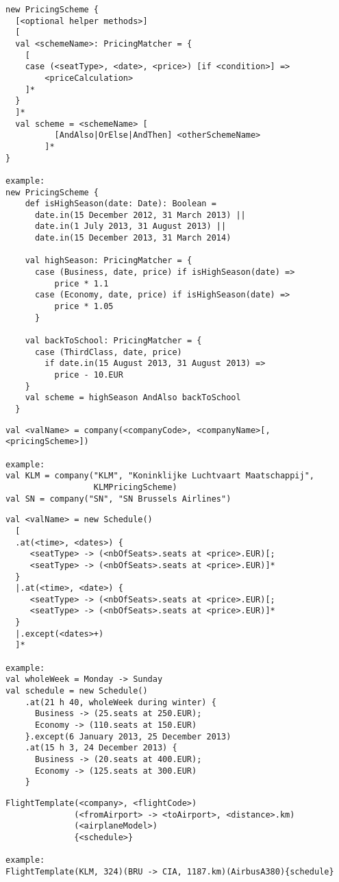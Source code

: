 \begin{lstlisting}
new PricingScheme {
  [<optional helper methods>]
  [
  val <schemeName>: PricingMatcher = {
    [
    case (<seatType>, <date>, <price>) [if <condition>] =>
        <priceCalculation>
    ]*
  }
  ]*
  val scheme = <schemeName> [
          [AndAlso|OrElse|AndThen] <otherSchemeName>
        ]*
}

example:
new PricingScheme {
    def isHighSeason(date: Date): Boolean =
      date.in(15 December 2012, 31 March 2013) ||
      date.in(1 July 2013, 31 August 2013) ||
      date.in(15 December 2013, 31 March 2014)

    val highSeason: PricingMatcher = {
      case (Business, date, price) if isHighSeason(date) =>
          price * 1.1
      case (Economy, date, price) if isHighSeason(date) =>
          price * 1.05
      }

    val backToSchool: PricingMatcher = {
      case (ThirdClass, date, price)
        if date.in(15 August 2013, 31 August 2013) =>
          price - 10.EUR
    }
    val scheme = highSeason AndAlso backToSchool
  }
\end{lstlisting}

\begin{lstlisting}
val <valName> = company(<companyCode>, <companyName>[, <pricingScheme>])

example:
val KLM = company("KLM", "Koninklijke Luchtvaart Maatschappij",
                  KLMPricingScheme)
val SN = company("SN", "SN Brussels Airlines")
\end{lstlisting}

\begin{lstlisting}
val <valName> = new Schedule()
  [
  .at(<time>, <dates>) {
     <seatType> -> (<nbOfSeats>.seats at <price>.EUR)[;
     <seatType> -> (<nbOfSeats>.seats at <price>.EUR)]*
  }
  |.at(<time>, <date>) {
     <seatType> -> (<nbOfSeats>.seats at <price>.EUR)[;
     <seatType> -> (<nbOfSeats>.seats at <price>.EUR)]*
  }
  |.except(<dates>+)
  ]*

example:
val wholeWeek = Monday -> Sunday
val schedule = new Schedule()
    .at(21 h 40, wholeWeek during winter) {
      Business -> (25.seats at 250.EUR);
      Economy -> (110.seats at 150.EUR)
    }.except(6 January 2013, 25 December 2013)
    .at(15 h 3, 24 December 2013) {
      Business -> (20.seats at 400.EUR);
      Economy -> (125.seats at 300.EUR)
    }
\end{lstlisting}

\begin{lstlisting}
FlightTemplate(<company>, <flightCode>)
              (<fromAirport> -> <toAirport>, <distance>.km)
              (<airplaneModel>)
              {<schedule>}

example:
FlightTemplate(KLM, 324)(BRU -> CIA, 1187.km)(AirbusA380){schedule}
\end{lstlisting}


